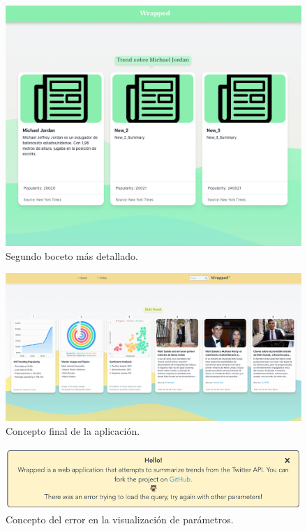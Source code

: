 \begin{figure}[H]
    \centering
    \myfloatalign
    \includegraphics[width=1\textwidth]{gfx/segundo-boceto.png}
    \caption[Segundo boceto más detallado]{Segundo boceto más detallado.}\label{gfx:segundo-boceto}
\end{figure}

\begin{figure}[H]
    \centering
    \myfloatalign
    \includegraphics[width=1\textwidth]{gfx/tercer-boceto.png}
    \caption[Concepto final de la aplicación]{Concepto final de la aplicación.}\label{gfx:tercer-boceto}
\end{figure}

\begin{figure}[H]
    \centering
    \myfloatalign
    \includegraphics[width=1\textwidth]{gfx/boceto-error.png}
    \caption[Concepto del error en la visualización de parámetros]{Concepto del error en la visualización de parámetros.}\label{gfx:boceto-error}
\end{figure}

